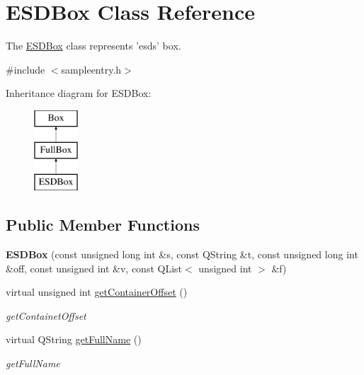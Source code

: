 \hypertarget{class_e_s_d_box}{\section{E\-S\-D\-Box Class Reference}
\label{class_e_s_d_box}
}


The \hyperlink{class_e_s_d_box}{E\-S\-D\-Box} class represents 'esds' box.  




{\ttfamily \#include $<$sampleentry.\-h$>$}

Inheritance diagram for E\-S\-D\-Box\-:\begin{figure}[H]
\begin{center}
\leavevmode
\includegraphics[height=3.000000cm]{class_e_s_d_box}
\end{center}
\end{figure}
\subsection*{Public Member Functions}
\begin{DoxyCompactItemize}
\item 
\hypertarget{class_e_s_d_box_acdcab8b99adf00483b3e0b31ba262462}{{\bfseries E\-S\-D\-Box} (const unsigned long int \&s, const Q\-String \&t, const unsigned long int \&off, const unsigned int \&v, const Q\-List$<$ unsigned int $>$ \&f)}\label{class_e_s_d_box_acdcab8b99adf00483b3e0b31ba262462}

\item 
virtual unsigned int \hyperlink{class_e_s_d_box_a17698371f055f5deec6e9819c9b302cd}{get\-Container\-Offset} ()
\begin{DoxyCompactList}\small\item\em get\-Containet\-Offset \end{DoxyCompactList}\item 
virtual Q\-String \hyperlink{class_e_s_d_box_a9e610dce6e72228e08fcbdfca0177c85}{get\-Full\-Name} ()
\begin{DoxyCompactList}\small\item\em get\-Full\-Name \end{DoxyCompactList}\end{DoxyCompactItemize}
